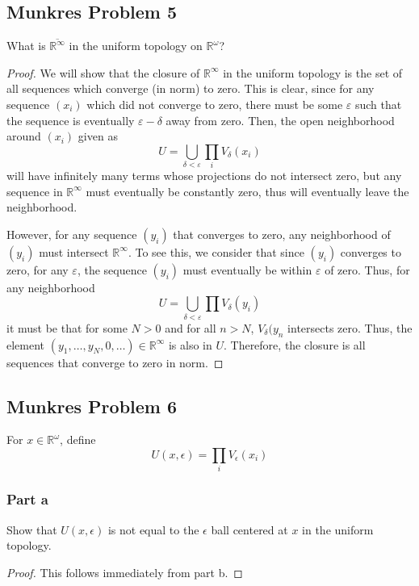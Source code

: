 \documentclass[fontsize=11pt]{scrartcl} %
\numberwithin{equation}{section} %
\numberwithin{figure}{section} %
\numberwithin{table}{section} %
\newcommand{\R}{\mathbb{R}}
\begin{document}
\subsection*{Munkres Problem 5}
What is $\overline{\R^{\infty}}$ in the uniform topology on $\R^{\omega}$?
\\
\begin{proof}
    We will show that the closure of $\R^{\infty}$ in the uniform topology
    is the set of all sequences which converge (in norm) to zero. This is clear,
    since for any sequence $(x_i)$ which did not converge to zero, there must be some
    $\varepsilon$ such that the sequence is eventually $\varepsilon - \delta$ away from
    zero.
    Then, the open neighborhood around $(x_i)$ given as
    \[
        U = \bigcup_{\delta<\varepsilon}\prod_i V_{\delta}(x_i)
    \]
    will have infinitely many terms whose projections do not intersect zero,
    but any sequence in $\R^{\infty}$ must eventually be constantly zero, thus
    will eventually leave the neighborhood.

    However, for any sequence $(y_i)$ that converges to zero, any neighborhood
    of $(y_i)$ must intersect $\R^{\infty}$. To see this, we consider that
    since $(y_i)$ converges to zero, for any $\varepsilon$, the sequence
    $(y_i)$ must eventually be within $\varepsilon$ of zero. Thus, for any
    neighborhood
    \[
        U = \bigcup_{\delta<\varepsilon}\prod V_{\delta}(y_i)
    \]
    it must be that for some $N>0$ and for all $n>N$, $V_{\delta}(y_n$
    intersects zero. Thus, the element $(y_1,\ldots,y_N,0,\ldots)\in\R^{\infty}$
    is also in $U$.
    Therefore, the closure is all sequences that converge to zero in norm.
\end{proof}
\subsection*{Munkres Problem 6}
For $x\in\R^{\omega}$, define
\[
    U(x,\epsilon) = \prod_i V_{\epsilon}(x_i)
\]
\subsubsection*{Part a}
Show that $U(x,\epsilon)$ is not equal to the $\epsilon$ ball centered at $x$
in the uniform topology.
\\
\begin{proof}
This follows immediately from part b.
\end{proof}
\end{document}
